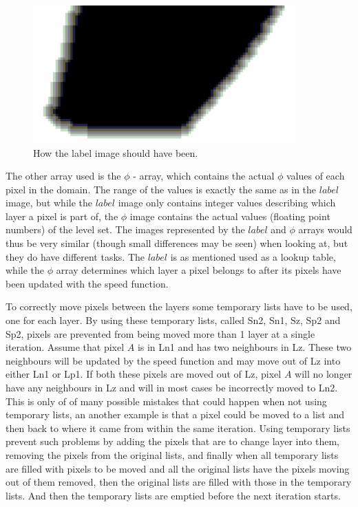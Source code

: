 \begin{figure}[h!]
\centering
\includegraphics[width=0.90\textwidth]{implemented/labelOkEx}
\caption{How the label image should have been.}
\label{labelOkEx}
\end{figure}

The other array used is the $\phi$ - array, which contains the actual $\phi$ values of each pixel in the domain. The range of the values is exactly the same as in the $label$ image, but while the $label$ image only contains integer values describing which layer a pixel is part of, the $\phi$ image contains the actual values (floating point numbers) of the level set. The images represented by the $label$ and $\phi$ arrays would thus be very similar (though small differences may be seen) when looking at, but they do have different tasks. The $label$ is as mentioned used as a lookup table, while the $\phi$ array determines which layer a pixel belongs to after its pixels have been updated with the speed function.

To correctly move pixels between the layers some temporary lists have to be used, one for each layer. By using these temporary lists, called Sn2, Sn1, Sz, Sp2 and Sp2, pixels are prevented from being moved more than 1 layer at a single iteration. Assume that pixel $A$ is in Ln1 and has two neighbours in Lz. These two neighbours will be updated by the speed function and may move out of Lz into either Ln1 or Lp1. If both these pixels are moved out of Lz, pixel $A$ will no longer have any neighbours in Lz and will in most cases be incorrectly moved to Ln2. This is only of of many possible mistakes that could happen when not using temporary lists, an another example is that a pixel could be moved to a list and then back to where it came from within the same iteration. Using temporary lists prevent such problems by adding the pixels that are to change layer into them, removing the pixels from the original lists, and finally when all temporary lists are filled with pixels to be moved and all the original lists have the pixels moving out of them removed, then the original lists are filled with those in the temporary lists. And then the temporary lists are emptied before the next iteration starts.


